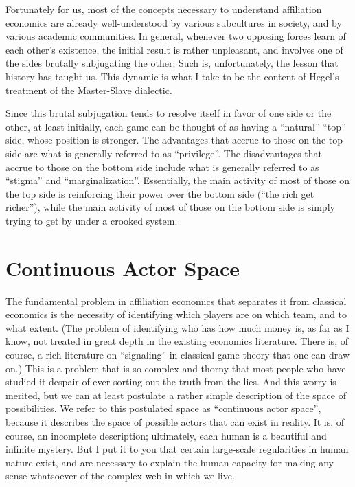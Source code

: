 \documentclass{article}
\begin{document}
Fortunately for us, most of the concepts necessary to understand
affiliation economics are already well-understood by various
subcultures in society, and by various academic communities. In
general, whenever two opposing forces learn of each other's existence,
the initial result is rather unpleasant, and involves one of the sides
brutally subjugating the other. Such is, unfortunately, the lesson
that history has taught us. This dynamic is what I take to be the
content of Hegel's treatment of the Master-Slave dialectic.

Since this brutal subjugation tends to resolve itself in favor of one
side or the other, at least initially, each game can be thought of as
having a ``natural'' ``top'' side, whose position is stronger. The
advantages that accrue to those on the top side are what is generally
referred to as ``privilege''. The disadvantages that accrue to those
on the bottom side include what is generally referred to as ``stigma''
and ``marginalization''. Essentially, the main activity of most of
those on the top side is reinforcing their power over the bottom side
(``the rich get richer''), while the main activity of most of those on
the bottom side is simply trying to get by under a crooked system.

\section{Continuous Actor Space}

The fundamental problem in affiliation economics that separates it
from classical economics is the necessity of identifying which players
are on which team, and to what extent. (The problem of identifying who
has how much money is, as far as I know, not treated in great depth in
the existing economics literature. There is, of course, a rich
literature on ``signaling'' in classical game theory that one can draw
on.) This is a problem that is so complex and thorny that most people
who have studied it despair of ever sorting out the truth from the
lies. And this worry is merited, but we can at least postulate a
rather simple description of the space of possibilities. We refer to
this postulated space as ``continuous actor space'', because it
describes the space of possible actors that can exist in reality. It
is, of course, an incomplete description; ultimately, each human is a
beautiful and infinite mystery. But I put it to you that certain
large-scale regularities in human nature exist, and are necessary to
explain the human capacity for making any sense whatsoever of the
complex web in which we live.
\end{document}
